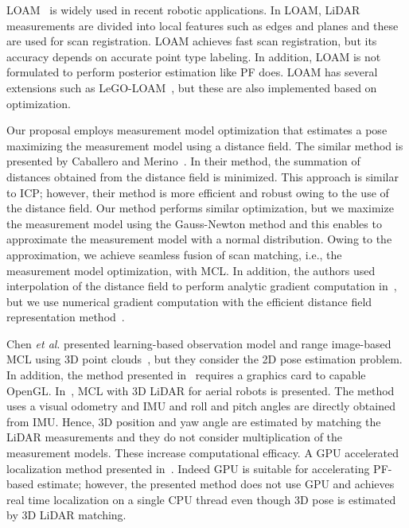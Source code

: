 \documentclass[letterpaper, 10 pt, conference]{ieeeconf}  %
\begin{document}
LOAM~\cite{LOAM} is widely used in recent robotic applications.
In LOAM, LiDAR measurements are divided into local features such as edges and planes and these are used for scan registration.
LOAM achieves fast scan registration, but its accuracy depends on accurate point type labeling.
In addition, LOAM is not formulated to perform posterior estimation like PF does.
LOAM has several extensions such as LeGO-LOAM~\cite{legoloam2018}, but these are also implemented based on optimization.

Our proposal employs measurement model optimization that estimates a pose maximizing the measurement model using a distance field.
The similar method is presented by Caballero and Merino~\cite{DLL}.
In their method, the summation of distances obtained from the distance field is minimized.
This approach is similar to ICP; however, their method is more efficient and robust owing to the use of the distance field.
Our method performs similar optimization, but we maximize the measurement model using the Gauss-Newton method and this enables to approximate the measurement model with a normal distribution.
Owing to the approximation, we achieve seamless fusion of scan matching, i.e., the measurement model optimization, with MCL.
In addition, the authors used interpolation of the distance field to perform analytic gradient computation in~\cite{DLL}, but we use numerical gradient computation with the efficient distance field representation method~\cite{AkaiIV2020}.

Chen {\it et al}. presented learning-based observation model and range image-based MCL using 3D point clouds~\cite{chen2020iros, chen2021icra}, but they consider the 2D pose estimation problem.
In addition, the method presented in~\cite{chen2021icra} requires a graphics card to capable OpenGL.
In~\cite{Perez-GrauIJARS2017}, MCL with 3D LiDAR for aerial robots is presented.
The method uses a visual odometry and IMU and roll and pitch angles are directly obtained from IMU.
Hence, 3D position and yaw angle are estimated by matching the LiDAR measurements and they do not consider multiplication of the measurement models.
These increase computational efficacy.
A GPU accelerated localization method presented in~\cite{CUDAMCL}.
Indeed GPU is suitable for accelerating PF-based estimate; however, the presented method does not use GPU and achieves real time localization on a single CPU thread even though 3D pose is estimated by 3D LiDAR matching.
\end{document}
